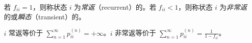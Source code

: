 \documentclass[../main.tex]{subfiles}
\begin{document}
\begin{definition}\label{def:7.3.4}
    若 $f_{ii}=1$，则称状态 $i$ 为\emph{常返}（recurrent）的。若 $f_{ii}<1$，则称状态 $i$ 为\emph{非常返}的或\emph{瞬态}（transient）的。
\end{definition}

\begin{theorem}\label{thm:7.3.1}
    $i$ 常返等价于 $\sum_{n=1}^\infty p_{ii}^{(n)}=+\infty$。$i$ 非常返等价于 $\sum_{n=1}^\infty p_{ii}^{(n)}=\frac1{1-f_{ii}}$。
\end{theorem}
\end{document}
